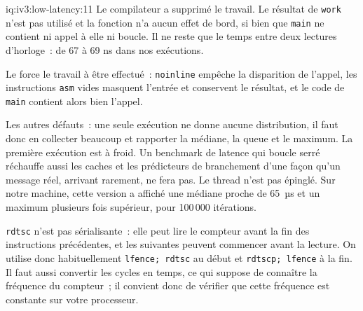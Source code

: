 \begin{solution}{iq:iv3:low-latency:11}
Le compilateur a supprimé le travail. Le résultat de \texttt{work} n'est pas utilisé et la fonction n'a aucun effet de bord, si bien que \texttt{main} ne contient ni appel à elle ni boucle. Il ne reste que le temps entre deux lectures d'horloge~: de 67 à 69 ns dans nos exécutions.

Le  force le travail à être effectué~: \texttt{noinline} empêche la disparition de l'appel, les instructions \texttt{asm} vides masquent l'entrée et conservent le résultat, et le code de \texttt{main} contient alors bien l'appel.
\label{lst:iv3:ll:benchgood}

Les autres défauts~: une seule exécution ne donne aucune distribution, il faut donc en collecter beaucoup et rapporter la médiane, la queue et le maximum. La première exécution est à froid. Un benchmark de latence qui boucle serré réchauffe aussi les caches et les prédicteurs de branchement d'une façon qu'un message réel, arrivant rarement, ne fera pas. Le thread n'est pas épinglé. Sur notre machine, cette version a affiché une médiane proche de 65~µs et un maximum plusieurs fois supérieur, pour 100\,000 itérations.

\texttt{rdtsc} n'est pas sérialisante~: elle peut lire le compteur avant la fin des instructions précédentes, et les suivantes peuvent commencer avant la lecture. On utilise donc habituellement \texttt{lfence; rdtsc} au début et \texttt{rdtscp; lfence} à la fin. Il faut aussi convertir les cycles en temps, ce qui suppose de connaître la fréquence du compteur~; il convient donc de vérifier que cette fréquence est constante sur votre processeur.

\end{solution}

